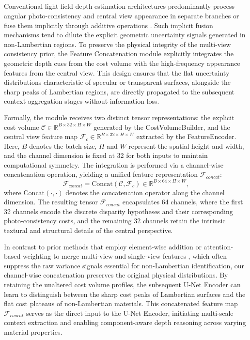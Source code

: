 \documentclass[lettersize,journal]{IEEEtran}
\begin{document}
\subsection{}

Conventional light field depth estimation architectures predominantly process angular photo-consistency and central view appearance in separate branches or fuse them implicitly through additive operations \cite{heber2018}. Such implicit fusion mechanisms tend to dilute the explicit geometric uncertainty signals generated in non-Lambertian regions. To preserve the physical integrity of the multi-view consistency prior, the Feature Concatenation module explicitly integrates the geometric depth cues from the cost volume with the high-frequency appearance features from the central view. This design ensures that the flat uncertainty distributions characteristic of specular or transparent surfaces, alongside the sharp peaks of Lambertian regions, are directly propagated to the subsequent context aggregation stages without information loss.

Formally, the module receives two distinct tensor representations: the explicit cost volume $\mathcal{C} \in \mathbb{R}^{B \times 32 \times H \times W}$ generated by the CostVolumeBuilder, and the central view feature map $\mathcal{F}_c \in \mathbb{R}^{B \times 32 \times H \times W}$ extracted by the FeatureEncoder. Here, $B$ denotes the batch size, $H$ and $W$ represent the spatial height and width, and the channel dimension is fixed at 32 for both inputs to maintain computational symmetry. The integration is performed via a channel-wise concatenation operation, yielding a unified feature representation $\mathcal{F}_{concat}$:
\begin{equation}
\mathcal{F}_{concat} = \text{Concat}(\mathcal{C}, \mathcal{F}_c) \in \mathbb{R}^{B \times 64 \times H \times W},
\end{equation}
where $\text{Concat}(\cdot, \cdot)$ denotes the concatenation operator along the channel dimension. The resulting tensor $\mathcal{F}_{concat}$ encapsulates 64 channels, where the first 32 channels encode the discrete disparity hypotheses and their corresponding photo-consistency costs, and the remaining 32 channels retain the intrinsic textural and structural details of the central perspective.

In contrast to prior methods that employ element-wise addition or attention-based weighting to merge multi-view and single-view features \cite{li2021}, which often suppress the raw variance signals essential for non-Lambertian identification, our channel-wise concatenation preserves the original physical distributions. By retaining the unaltered cost volume profiles, the subsequent U-Net Encoder can learn to distinguish between the sharp cost peaks of Lambertian surfaces and the flat cost plateaus of non-Lambertian materials. This concatenated feature map $\mathcal{F}_{concat}$ serves as the direct input to the U-Net Encoder, initiating multi-scale context extraction and enabling component-aware depth reasoning across varying material properties.
\end{document}
